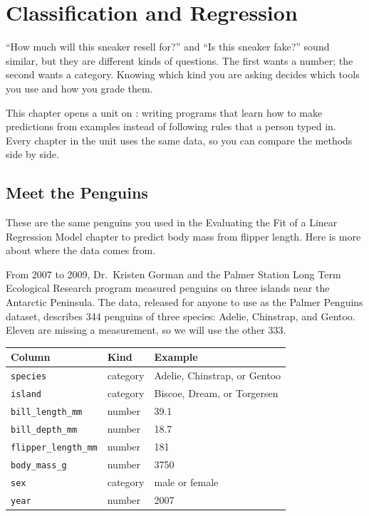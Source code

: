 \chapter{Classification and Regression}

``How much will this sneaker resell for?'' and ``Is this sneaker fake?'' sound
similar, but they are different kinds of questions. The first wants a number;
the second wants a category. Knowing which kind you are asking decides which
tools you use and how you grade them.

This chapter opens a unit on : writing programs that
learn how to make predictions from examples instead of following rules that a person typed in. Every
chapter in the unit uses the same data, so you can compare the methods side by side.

\section{Meet the Penguins}
These are the same penguins you used in the Evaluating the Fit of a Linear Regression Model chapter to predict body mass from flipper length. Here is more about
where the data comes from.

From 2007 to 2009, Dr.\ Kristen Gorman and the Palmer Station Long Term Ecological Research program
measured penguins on three islands near the Antarctic Peninsula. The data, released for anyone to use
as the Palmer Penguins dataset, describes 344 penguins of three species: Adelie, Chinstrap, and Gentoo.
Eleven are missing a measurement, so we will use the other 333.

\begin{center}
\begin{tabular}{l l l}
\textbf{Column} & \textbf{Kind} & \textbf{Example} \\
\hline
\texttt{species} & category & Adelie, Chinstrap, or Gentoo \\
\texttt{island} & category & Biscoe, Dream, or Torgersen \\
\texttt{bill\_length\_mm} & number & 39.1 \\
\texttt{bill\_depth\_mm} & number & 18.7 \\
\texttt{flipper\_length\_mm} & number & 181 \\
\texttt{body\_mass\_g} & number & 3750 \\
\texttt{sex} & category & male or female \\
\texttt{year} & number & 2007 \\
\end{tabular}
\end{center}

